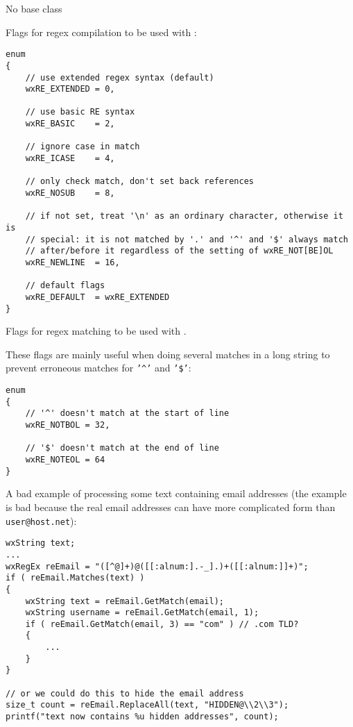 
No base class


Flags for regex compilation to be used with :

\begin{verbatim}
enum
{
    // use extended regex syntax (default)
    wxRE_EXTENDED = 0,

    // use basic RE syntax
    wxRE_BASIC    = 2,

    // ignore case in match
    wxRE_ICASE    = 4,

    // only check match, don't set back references
    wxRE_NOSUB    = 8,

    // if not set, treat '\n' as an ordinary character, otherwise it is
    // special: it is not matched by '.' and '^' and '$' always match
    // after/before it regardless of the setting of wxRE_NOT[BE]OL
    wxRE_NEWLINE  = 16,

    // default flags
    wxRE_DEFAULT  = wxRE_EXTENDED
}
\end{verbatim}

Flags for regex matching to be used with .

These flags are mainly useful when doing several matches in a long string
to prevent erroneous matches for {\tt '\textasciicircum'} and {\tt '\$'}:

\begin{verbatim}
enum
{
    // '^' doesn't match at the start of line
    wxRE_NOTBOL = 32,

    // '$' doesn't match at the end of line
    wxRE_NOTEOL = 64
}
\end{verbatim}


A bad example of processing some text containing email addresses (the example
is bad because the real email addresses can have more complicated form than
{\tt user@host.net}):

\begin{verbatim}
wxString text;
...
wxRegEx reEmail = "([^@]+)@([[:alnum:].-_].)+([[:alnum:]]+)";
if ( reEmail.Matches(text) )
{
    wxString text = reEmail.GetMatch(email);
    wxString username = reEmail.GetMatch(email, 1);
    if ( reEmail.GetMatch(email, 3) == "com" ) // .com TLD?
    {
        ...
    }
}

// or we could do this to hide the email address
size_t count = reEmail.ReplaceAll(text, "HIDDEN@\\2\\3");
printf("text now contains %u hidden addresses", count);
\end{verbatim}

